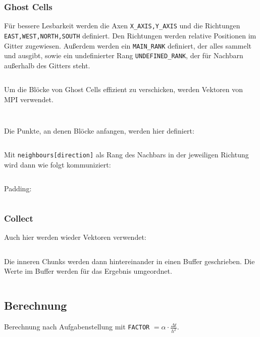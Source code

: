 \documentclass[12pt]{article}
\begin{document}
\subsubsection{Ghost Cells}
Für bessere Lesbarkeit werden die Axen \verb+X_AXIS,Y_AXIS+ und die Richtungen \verb+EAST,WEST,NORTH,SOUTH+ definiert. Den Richtungen werden relative Positionen im Gitter zugewiesen. Außerdem werden ein \verb+MAIN_RANK+ definiert, der alles sammelt und ausgibt, sowie ein undefinierter Rang \verb+UNDEFINED_RANK+, der für Nachbarn außerhalb des Gitters steht.
\inputminted[fontsize=\scriptsize, firstline=22, lastline=48]{C}{../src/waermeleitung.h}
Um die Blöcke von Ghost Cells effizient zu verschicken, werden Vektoren von MPI verwendet.
\inputminted[fontsize=\scriptsize, firstline=51, lastline=62]{C}{../src/waermeleitung.c}
\inputminted[fontsize=\scriptsize, firstline=3, lastline=16]{C}{../src/comms.c}
Die Punkte, an denen Blöcke anfangen, werden hier definiert:
\inputminted[fontsize=\scriptsize, firstline=18, lastline=29]{C}{../src/comms.c}
Mit \verb+neighbours[direction]+ als Rang des Nachbars in der jeweiligen Richtung wird dann wie folgt kommuniziert:
\inputminted[fontsize=\scriptsize, firstline=59, lastline=80]{C}{../src/comms.c}
Padding:
\inputminted[fontsize=\scriptsize, firstline=31, lastline=57]{C}{../src/comms.c}
\subsubsection{Collect}
Auch hier werden wieder Vektoren verwendet:
\inputminted[fontsize=\scriptsize, firstline=63, lastline=66]{C}{../src/waermeleitung.c}
Die inneren Chunks werden dann hintereinander in einen Buffer geschrieben. Die Werte im Buffer werden für das Ergebnis umgeordnet.
\inputminted[fontsize=\scriptsize, firstline=43, lastline=71]{C}{../src/print.c}

\subsection{Berechnung}
Berechnung nach Aufgabenstellung mit \verb+FACTOR+ $= \alpha \cdot \frac{\Delta t}{h^2}$.
\inputminted[fontsize=\scriptsize, firstline=126, lastline=134]{C}{../src/waermeleitung.c}


\clearpage
\end{document}
